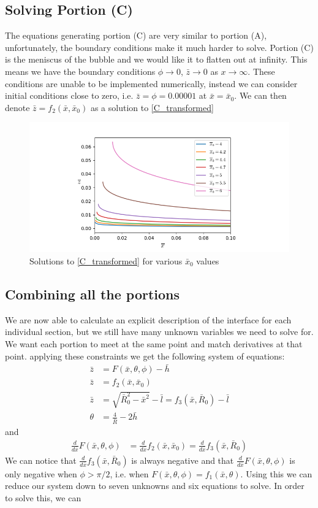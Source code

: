 \subsection{Solving Portion (C)}

The equations generating portion (C) are very similar to portion (A), unfortunately, the boundary conditions make it much harder to solve. Portion (C) is the meniscus of the bubble and we would like it to flatten out at infinity. This means we have the boundary conditions $\phi \rightarrow 0$, $\bar{z} \rightarrow 0$ as $x \rightarrow \infty$. These conditions are unable to be implemented numerically, instead we can consider initial conditions close to zero, i.e. $\bar{z}=\phi=0.00001$ at $\bar{x}=\bar{x}_0$. We can then denote $\bar{z}=f_2(\bar{x},\bar{x}_0)$ as a solution to \ref{C_transformed}

\begin{figure}[hb]
    \centering
    \includegraphics[width=0.85\linewidth]{WriteUp/images/menisc.png}
    \caption{Solutions to \ref{C_transformed} for various $\bar{x}_0$ values}
    \label{fig:10}
\end{figure}

\subsection{Combining all the portions}

We are now able to calculate an explicit description of the interface for each individual section, but we still have many unknown variables we need to solve for. We want each portion to meet at the same point and match derivatives at that point. applying these constraints we get the following system of equations:
\begin{align}
    \bar{z}&=F(\bar{x},\theta,\phi) - \bar{h} \\
    \bar{z}&=f_2(\bar{x},\bar{x}_0) \\
    \bar{z}&=\sqrt{\bar{R}_0^2-\bar{x}^2} - \bar{l}=f_3(\bar{x},\bar{R}_0)-\bar{l} \\
    \theta&=\frac{4}{\bar{R}}-2\bar{h}
\end{align}
and
\begin{align}
    \frac{d}{d\bar{x}}F(\bar{x},\theta,\phi)&=\frac{d}{d\bar{x}}f_2(\bar{x},\bar{x}_0) = \frac{d}{d\bar{x}}f_3(\bar{x},\bar{R}_0)
\end{align}
We can notice that $\frac{d}{d\bar{x}}f_3(\bar{x},\bar{R}_0)$ is always negative and that $\frac{d}{d\bar{x}}F(\bar{x},\theta,\phi)$ is only negative when $\phi>\pi/2$, i.e. when $F(\bar{x},\theta,\phi)=f_1(\bar{x},\theta)$. Using this we can reduce our system down to seven unknowns and six equations to solve.
In order to solve this, we can